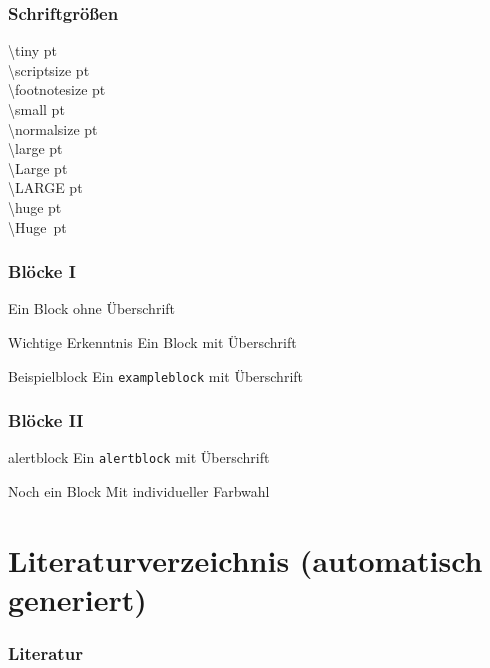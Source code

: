 \documentclass[aspectratio=169,16pt]{beamer}
\makeatletter
\newcommand{\showfontsize}{\nprounddigits{2}\numprint{\f@size{}} pt}
\makeatother
\begin{document}
\begin{frame}[allowframebreaks]
  \frametitle{Schriftgrößen}
  \tiny \textbackslash tiny \showfontsize\\
  \scriptsize \textbackslash scriptsize \showfontsize\\
  \footnotesize \textbackslash footnotesize \showfontsize\\
  \small \textbackslash small \showfontsize\\
  \normalsize \textbackslash normalsize \showfontsize\\
  \large \textbackslash large \showfontsize\\
  \Large \textbackslash Large \showfontsize\\
  \LARGE \textbackslash LARGE \showfontsize\\
  \huge \textbackslash huge \showfontsize\\
  \hbox{\Huge \textbackslash Huge \showfontsize}
\end{frame}

\begin{frame}
  \frametitle{Blöcke I}

  \begin{block}{}
    Ein Block ohne Überschrift
  \end{block}

  \begin{block}{Wichtige Erkenntnis}
    Ein Block mit Überschrift
  \end{block}

  \begin{exampleblock}{Beispielblock}
    Ein \texttt{exampleblock} mit Überschrift
  \end{exampleblock}
\end{frame}

\begin{frame}
  \frametitle{Blöcke II}
  \begin{alertblock}{alertblock}
    Ein \texttt{alertblock} mit Überschrift
  \end{alertblock}

  {
    \begin{block}{Noch ein Block}
      Mit individueller Farbwahl
    \end{block}
  }

\end{frame}

\appendix\nocite{*}
\section{Literaturverzeichnis (automatisch generiert)}
\begin{frame}
  \frametitle{Literatur}

\end{frame}
\end{document}

